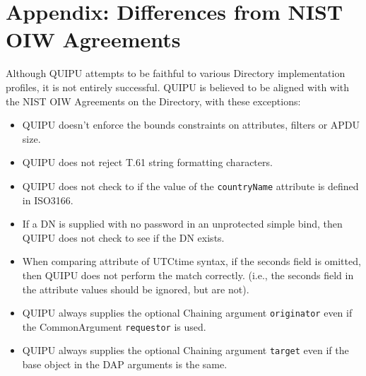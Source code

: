 \newpage
\section*	{Appendix: Differences from NIST OIW Agreements}
Although QUIPU attempts to be faithful to various Directory implementation
profiles,
it is not entirely successful.
QUIPU is believed to be aligned with with the NIST OIW Agreements on the
Directory,
with these exceptions:
\begin{itemize}
\item	QUIPU doesn't enforce the bounds constraints on attributes, filters or 
APDU size.

\item	QUIPU does not reject T.61 string formatting characters.

\item	QUIPU does not check to if the value of the \verb"countryName"
attribute is defined in ISO3166.

\item	If a DN is supplied with no password in an unprotected simple bind,
then QUIPU does not check to see if the DN exists.

\item	When comparing attribute of UTCtime syntax,
if the seconds field is omitted,
then QUIPU does not perform the match correctly.
(i.e.,
the seconds field in the attribute values should be ignored, but are not).

\item	QUIPU always supplies the optional Chaining argument \verb"originator"
even if the CommonArgument \verb"requestor" is used.

\item	QUIPU always supplies the optional Chaining argument \verb"target"
even if the base object in the DAP arguments is the same.
\end{itemize}
